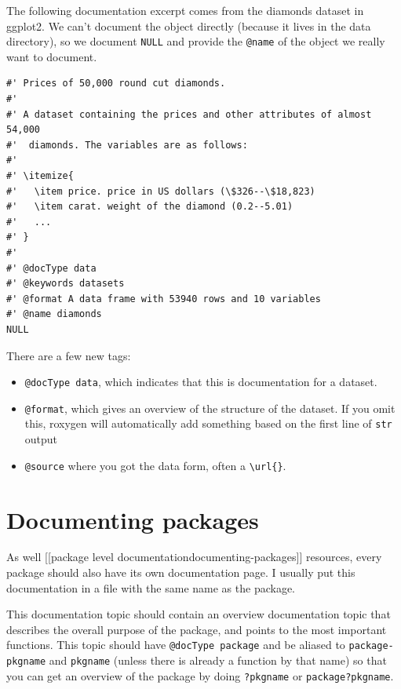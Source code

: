 The following documentation excerpt comes from the diamonds dataset in
ggplot2. We can't document the object directly (because it lives in the
data directory), so we document \texttt{NULL} and provide the
\texttt{@name} of the object we really want to document.

\begin{verbatim}
#' Prices of 50,000 round cut diamonds.
#' 
#' A dataset containing the prices and other attributes of almost 54,000
#'  diamonds. The variables are as follows:
#' 
#' \itemize{
#'   \item price. price in US dollars (\$326--\$18,823)  
#'   \item carat. weight of the diamond (0.2--5.01) 
#'   ...
#' }
#' 
#' @docType data
#' @keywords datasets
#' @format A data frame with 53940 rows and 10 variables
#' @name diamonds
NULL
\end{verbatim}

There are a few new tags:

\begin{itemize}
\item
  \texttt{@docType data}, which indicates that this is documentation for
  a dataset.
\item
  \texttt{@format}, which gives an overview of the structure of the
  dataset. If you omit this, roxygen will automatically add something
  based on the first line of \texttt{str} output
\item
  \texttt{@source} where you got the data form, often a
  \texttt{\textbackslash{}url\{\}}.
\end{itemize}

\section{Documenting packages}

As well {[}{[}package level
documentation\textbar{}documenting-packages{]}{]} resources, every
package should also have its own documentation page. I usually put this
documentation in a file with the same name as the package.

This documentation topic should contain an overview documentation topic
that describes the overall purpose of the package, and points to the
most important functions. This topic should have
\texttt{@docType package} and be aliased to \texttt{package-pkgname} and
\texttt{pkgname} (unless there is already a function by that name) so
that you can get an overview of the package by doing \texttt{?pkgname}
or \texttt{package?pkgname}.

